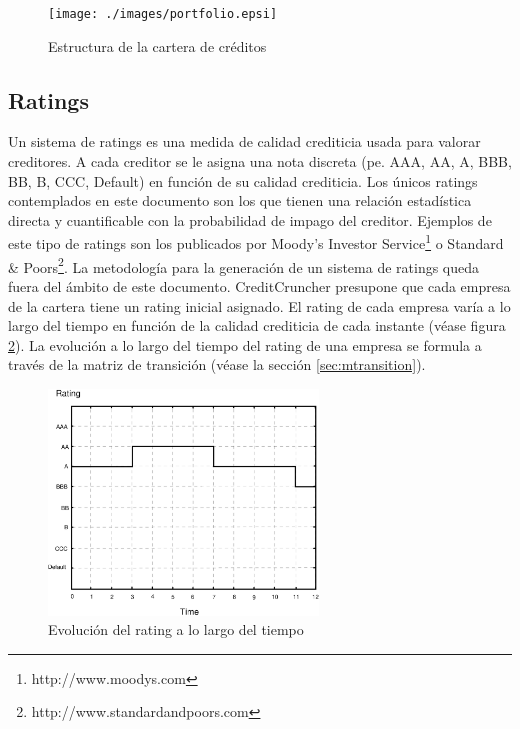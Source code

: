 \begin{figure}[!hb]
\begin{center}
\texttt{[image: ./images/portfolio.epsi]}
\caption{Estructura de la cartera de cr\'editos}
\label{portfolio}
\end{center}
\end{figure}


\subsection{Ratings}

Un sistema de ratings es una medida de calidad crediticia usada para
valorar creditores. A cada creditor se le asigna una nota discreta (pe. AAA,
AA, A, BBB, BB, B, CCC, Default) en funci\'on de su calidad
crediticia. Los \'unicos ratings contemplados en este documento 
son los que tienen una relaci\'on estad\'istica directa y cuantificable 
con la probabilidad de impago del creditor. Ejemplos de este tipo de ratings 
son los publicados por Moody's Investor Service\footnote{http://www.moodys.com} 
o Standard \& Poors\footnote{http://www.standardandpoors.com}. 
\newline
\newline
La metodolog\'ia para la generaci\'on de un sistema de ratings queda fuera del
\'ambito de este documento. CreditCruncher presupone que cada empresa de la 
cartera tiene un rating inicial asignado.
\newline
\newline
El rating de cada empresa var\'ia a lo largo del tiempo en funci\'on de la 
calidad crediticia de cada instante (v\'ease figura \ref{ratingevol}). 
La evoluci\'on a lo largo del tiempo del rating de una empresa se 
formula a trav\'es de la matriz de transici\'on (v\'ease la secci\'on 
\ref{sec:mtransition}).
\begin{figure}[!hb]
\begin{center}
\includegraphics[height=6cm, angle=0]{./images/ratingevol.eps}
\caption{Evoluci\'on del rating a lo largo del tiempo}
\label{ratingevol}
\end{center}
\end{figure}
